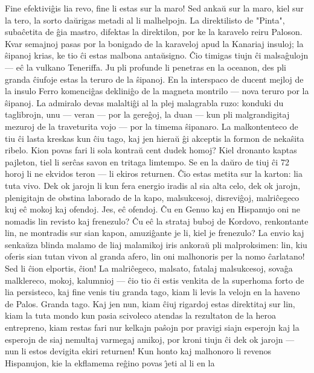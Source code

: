    Fine efektivi\^gis lia revo, fine li estas sur la maro! Sed anka\u u sur
la maro, kiel sur la tero, la sorto da\u urigas metadi al li
malhelpojn. La direktilisto de "Pinta", suba\^cetita de \^gia
mastro, difektas la direktilon, por ke la karavelo reiru Paloson.
Kvar semajnoj pasas por la bonigado de la karaveloj apud la Kanariaj
insuloj; la \^sipanoj krias, ke tio \^ci estas malbona anta\u
usigno. \^Cio timigas tiujn \^ci malsa\^gulojn --- e\^c la vulkano
Teneriffa. Ju pli profunde li penetras en la oceanon, des pli granda
\^ciufoje estas la teruro de la \^sipanoj. En la interspaco de
ducent mejloj de la insulo Ferro komenci\^gas deklini\^go de la
magneta montrilo --- nova teruro por la \^sipanoj. La admiralo devas
malalti\^gi al la plej malagrabla ruzo: konduki du taglibrojn, unu
--- veran --- por la gere\^goj, la duan --- kun pli malgrandigitaj
mezuroj de la traveturita vojo --- por la timema \^sipanaro. La
malkontenteco de tiu \^ci lasta kreskas kun \^ciu tago, kaj jen
hiera\u u \^gi akceptis la formon de neka\^sita ribelo. Kion povas
fari li sola kontra\u u cent dudek homoj? Kiel dronanto kaptas
pajleton, tiel li ser\^cas savon en tritaga limtempo. Se en la da\u
uro de tiuj \^ci 72 horoj li ne ekvidos teron --- li ekiros
returnen. \^Cio estas metita sur la karton: lia tuta vivo. Dek ok
jarojn li kun fera energio iradis al sia alta celo, dek ok jarojn,
plenigitajn de obstina laborado de la kapo, malsukcesoj,
disrevi\^goj, malri\^cegeco kuj e\^c mokoj kaj ofendoj. Jes, e\^c
ofendoj. \^Cu en Genuo kaj en Hispanujo oni ne nomadis lin revisto
kaj frenezulo? \^Cu e\^c la strataj buboj de Kordovo, renkontante
lin, ne montradis sur sian kapon, amuzi\^gante je li, kiel je
frenezulo? La envio kaj senka\u uza blinda malamo de liaj malamikoj
iris ankora\u u pli malproksimen: lin, kiu oferis sian tutan vivon
al granda afero, lin oni malhonoris per la nomo \^carlatano! Sed li
\^cion elportis, \^cion! La malri\^cegeco, malsato, fatalaj
malsukcesoj, sova\^ga malklereco, mokoj, kalumnioj --- \^cio tio
\^ci estis venkita de la superhoma forto de lia persisteco, kaj fine
venis tiu granda tago, kiam li levis la velojn en la haveno de
Palos. Granda tago. Kaj jen nun, kiam \^ciuj rigardoj estas
direktitaj sur lin, kiam la tuta mondo kun pasia scivoleco atendas
la rezultaton de la heroa entrepreno, kiam restas fari nur kelkajn
pa\^sojn por pravigi siajn esperojn kaj la esperojn de siaj nemultaj
varmegaj amikoj, por kroni tiujn \^ci dek ok jarojn --- nun li estos
devigita ekiri returnen! Kun honto kaj malhonoro li revenos
Hispanujon, kie la ekflamema re\^gino povas \^{\j}eti al li en la
